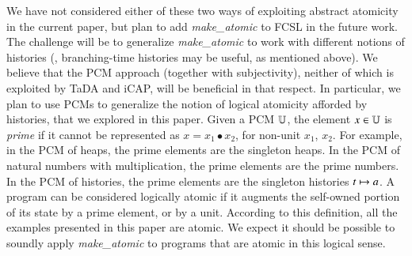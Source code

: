 We have not considered either of these two ways of exploiting abstract
atomicity in the current paper, 
%
%
%
but plan to add \emph{make\_atomic} to FCSL in the future work. The
challenge will be to generalize \emph{make\_atomic} to work with
different notions of histories (\eg, branching-time histories may be
useful, as mentioned above). We believe that the PCM approach
(together with subjectivity), neither of which is exploited by TaDA
and iCAP, will be beneficial in that respect. In particular, we plan
to use PCMs to generalize the notion of logical atomicity afforded by
histories, that we explored in this paper. Given a PCM $\mathbb{U}$, the
element $x \in \mathbb{U}$ is \emph{prime} if it cannot be represented as $x
= x_1 \bullet x_2$, for non-unit $x_1$, $x_2$. For example, in the PCM
of heaps, the prime elements are the singleton heaps. In the PCM of
natural numbers with multiplication, the prime elements are the prime
numbers. In the PCM of histories, the prime elements are the singleton
histories $t \mapsto a$. A program can be considered logically atomic if
it augments the self-owned portion of its state by a prime element, or
by a unit. According to this definition, all the examples presented in
this paper are atomic. We expect it should be possible to soundly
apply \emph{make\_atomic} to programs that are atomic in this logical
sense.

